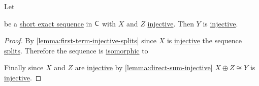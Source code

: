 \documentclass[../../main]{subfiles}
\begin{document}
\begin{proposition}
  Let
  \begin{center}
  \end{center}
  be a \hyperref[def:exact-sequence]{short exact sequence} in \(\mathsf{C}\) with \(X\) and \(Z\) \hyperref[def:injective-projective-object]{injective}.
  Then \(Y\) is \hyperref[def:injective-projective-object]{injective}.
\end{proposition}
\begin{proof}
  By \autoref{lemma:first-term-injective-splits} since \(X\) is \hyperref[def:injective-projective-object]{injective} the sequence \hyperref[prop:split-exact-sequence]{splits}.
    Therefore the sequence is \hyperref[def:categorical-isomorphism]{isomorphic} to
    \begin{center}
  \end{center}
  Finally since \(X\) and \(Z\) are \hyperref[def:injective-projective-object]{injective} by \autoref{lemma:direct-sum-injective} \(X \oplus Z \cong Y\) is \hyperref[def:injective-projective-object]{injective}.
\end{proof}
\end{document}
